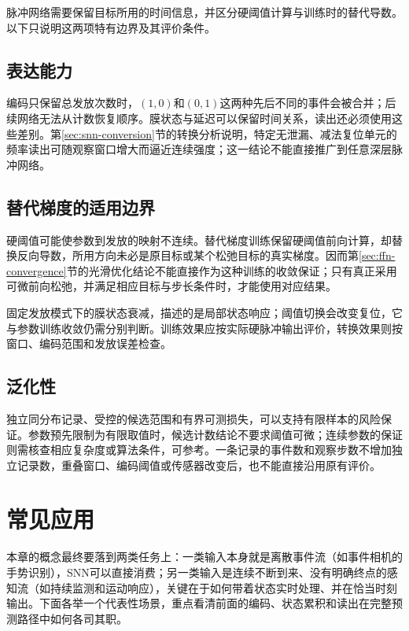 脉冲网络需要保留目标所用的时间信息，并区分硬阈值计算与训练时的替代导数。以下只说明这两项特有边界及其评价条件。

\subsection{表达能力}
\label{sec:snn-temporal-stability}

编码只保留总发放次数时，$(1,0)$和$(0,1)$这两种先后不同的事件会被合并；后续网络无法从计数恢复顺序。膜状态与延迟可以保留时间关系，读出还必须使用这些差别。第\ref{sec:snn-conversion}节的转换分析说明，特定无泄漏、减法复位单元的频率读出可随观察窗口增大而逼近连续强度；这一结论不能直接推广到任意深层脉冲网络。

\subsection{替代梯度的适用边界}
\label{sec:snn-convergence}

硬阈值可能使参数到发放的映射不连续。替代梯度训练保留硬阈值前向计算，却替换反向导数，所用方向未必是原目标或某个松弛目标的真实梯度。因而第\ref{sec:ffn-convergence}节的光滑优化结论不能直接作为这种训练的收敛保证；只有真正采用可微前向松弛，并满足相应目标与步长条件时，才能使用对应结果。

固定发放模式下的膜状态衰减，描述的是局部状态响应；阈值切换会改变复位，它与参数训练收敛仍需分别判断。训练效果应按实际硬脉冲输出评价，转换效果则按窗口、编码范围和发放误差检查。

\subsection{泛化性}
\label{sec:snn-generalization}

独立同分布记录、受控的候选范围和有界可测损失，可以支持有限样本的风险保证。参数预先限制为有限取值时，候选计数结论不要求阈值可微；连续参数的保证则需核查相应复杂度或算法条件，可参考。一条记录的事件数和观察步数不增加独立记录数，重叠窗口、编码阈值或传感器改变后，也不能直接沿用原有评价。

\section{常见应用}
\label{sec:snn-applications}

本章的概念最终要落到两类任务上：一类输入本身就是离散事件流（如事件相机的手势识别），SNN可以直接消费；另一类输入是连续不断到来、没有明确终点的感知流（如持续监测和运动响应），关键在于如何带着状态实时处理、并在恰当时刻输出。下面各举一个代表性场景，重点看清前面的编码、状态累积和读出在完整预测路径中如何各司其职。

